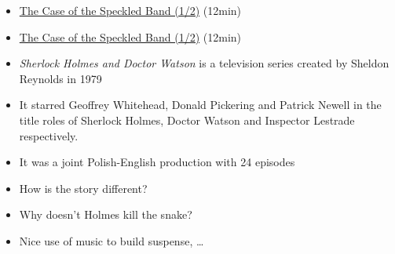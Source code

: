 \documentclass[a4paper,landscape,headrule,footrule,xetex]{foils}
\begin{document}
\begin{itemize}
\item \href{https://www.youtube.com/watch?v=1pGT51t5xNE}{The Case of
    the Speckled
    Band (1/2)} (12min)
\item \href{https://www.youtube.com/watch?v=L83Ugq8o3i8}{The Case of
    the  Speckled
    Band (1/2)} (12min)
\item \textit{Sherlock Holmes and Doctor Watson} is a television
  series created by Sheldon Reynolds in 1979
\item  It starred Geoffrey Whitehead, Donald Pickering and Patrick
  Newell in the title roles of Sherlock Holmes, Doctor Watson and
  Inspector Lestrade respectively.
\item It was a joint Polish-English production with 24 episodes

\item How is the story different?
\item Why doesn’t Holmes kill the snake?
\item Nice use of music to build suspense, \dots{}
\end{itemize}



\end{document}
